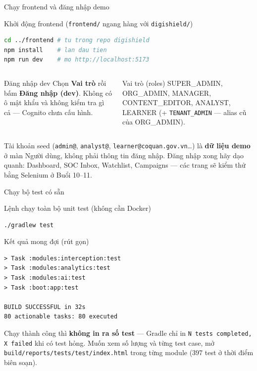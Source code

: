 \documentclass[aspectratio=169,12pt]{beamer}
\begin{document}
\begin{frame}[fragile]{Chạy frontend và đăng nhập demo}
  \begin{block}{Khởi động frontend (\texttt{frontend/} ngang hàng với \texttt{digishield/})}
\begin{lstlisting}[language=bash]
cd ../frontend # tu trong repo digishield
npm install    # lan dau tien
npm run dev    # mo http://localhost:5173
\end{lstlisting}
  \end{block}

  \vspace{0.2em}
  \begin{columns}
    \begin{block}{Đăng nhập dev}
      \small Chọn \textbf{Vai trò} rồi bấm \textbf{Đăng nhập (dev)}.
      Không có ô mật khẩu và không kiểm tra gì cả --- Cognito chưa cấu hình.
    \end{block}

    \begin{block}{Vai trò (roles)}
      \small SUPER\_ADMIN, ORG\_ADMIN, MANAGER, CONTENT\_EDITOR,
      ANALYST, LEARNER (+ \texttt{TENANT\_ADMIN} --- alias cũ của ORG\_ADMIN).
    \end{block}
  \end{columns}

  \vspace{0.2em}
  {\footnotesize Tài khoản seed (\texttt{admin@}, \texttt{analyst@},
  \texttt{learner@coquan.gov.vn}\dots) là \textbf{dữ liệu demo} ở màn Người dùng,
  không phải thông tin đăng nhập. Đăng nhập xong hãy dạo quanh: Dashboard,
  SOC Inbox, Watchlist, Campaigns --- các trang sẽ kiểm thử bằng Selenium
  ở Buổi 10--11.}
\end{frame}

\begin{frame}[fragile]{Chạy bộ test có sẵn}
  \begin{block}{Lệnh chạy toàn bộ unit test (không cần Docker)}
\begin{lstlisting}[language=bash]
./gradlew test
\end{lstlisting}
  \end{block}

  \begin{block}{Kết quả mong đợi (rút gọn)}
\begin{lstlisting}[basicstyle=\ttfamily\footnotesize]
> Task :modules:interception:test
> Task :modules:analytics:test
> Task :modules:ai:test
> Task :boot:app:test

BUILD SUCCESSFUL in 32s
80 actionable tasks: 80 executed
\end{lstlisting}
  \end{block}

  \small Chạy thành công thì \textbf{không in ra số test} --- Gradle chỉ in
  \texttt{N tests completed, X failed} khi có test hỏng. Muốn xem số lượng và
  từng test case, mở \texttt{build/reports/tests/test/index.html} trong từng
  module (397 test ở thời điểm biên soạn).
\end{frame}
\end{document}
